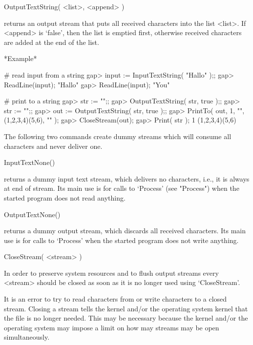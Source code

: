 \>OutputTextString( <list>, <append> )

returns an output stream that puts  all received characters into the list
<list>.   If <append>   is  `false',  then  the list   is  emptied first,
otherwise received characters are added at the end of the list.

*Example*

\begintt
    # read input from a string
    gap> input := InputTextString( "Hallo\nYou\n" );;
    gap> ReadLine(input);
    "Hallo\n"
    gap> ReadLine(input);
    "You\n"

    # print to a string
    gap> str := "";;
    gap> OutputTextString( str, true );;
    gap> str := "";;                    
    gap> out := OutputTextString( str, true );;
    gap> PrintTo( out, 1, "\n", (1,2,3,4)(5,6), "\n" );
    gap> CloseStream(out);
    gap> Print( str );
    1
    (1,2,3,4)(5,6)
\endtt


The following  two commands create  dummy streams  which will consume all
characters and never deliver one.


\>InputTextNone()

returns a dummy input text stream, which delivers no characters, i.e., it
is always at end of stream.  Its main use  is for calls to `Process' (see
"Process") when the started program does not read anything.

\>OutputTextNone()

returns a dummy output   stream, which discards all received  characters.
Its main use is for calls to `Process' when  the started program does not
write anything.


\>CloseStream( <stream> )

In order  to preserve system resources  and to flush output streams every
<stream> should  be  closed  as soon   as  it is   no longer   used using
`CloseStream'.

It is an error to  try to read  characters from or  write characters to a
closed  stream.   Closing a  stream tells  the {\GAP}   kernel and/or the
operating system kernel  that the file is  no longer needed.  This may be
necessary  because  the {\GAP} kernel  and/or  the  operating  system may
impose a limit on how may streams may be open simultaneously.


